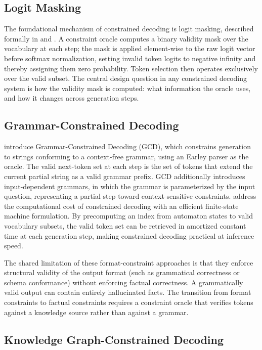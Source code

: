 \subsection{Logit Masking}

The foundational mechanism of constrained decoding is logit masking, described formally in \citet{geng2023gcd} and \citet{willard2023outlines}. A constraint oracle computes a binary validity mask over the vocabulary at each step; the mask is applied element-wise to the raw logit vector before softmax normalization, setting invalid token logits to negative infinity and thereby assigning them zero probability. Token selection then operates exclusively over the valid subset. The central design question in any constrained decoding system is how the validity mask is computed: what information the oracle uses, and how it changes across generation steps.

\subsection{Grammar-Constrained Decoding}

\citet{geng2023gcd} introduce Grammar-Constrained Decoding (GCD), which constrains generation to strings conforming to a context-free grammar, using an Earley parser as the oracle. The valid next-token set at each step is the set of tokens that extend the current partial string as a valid grammar prefix. GCD additionally introduces input-dependent grammars, in which the grammar is parameterized by the input question, representing a partial step toward context-sensitive constraints. \citet{willard2023outlines} address the computational cost of constrained decoding with an efficient finite-state machine formulation. By precomputing an index from automaton states to valid vocabulary subsets, the valid token set can be retrieved in amortized constant time at each generation step, making constrained decoding practical at inference speed.

The shared limitation of these format-constraint approaches is that they enforce structural validity of the output format (such as grammatical correctness or schema conformance) without enforcing factual correctness. A grammatically valid output can contain entirely hallucinated facts. The transition from format constraints to factual constraints requires a constraint oracle that verifies tokens against a knowledge source rather than against a grammar.

\subsection{Knowledge Graph-Constrained Decoding}

